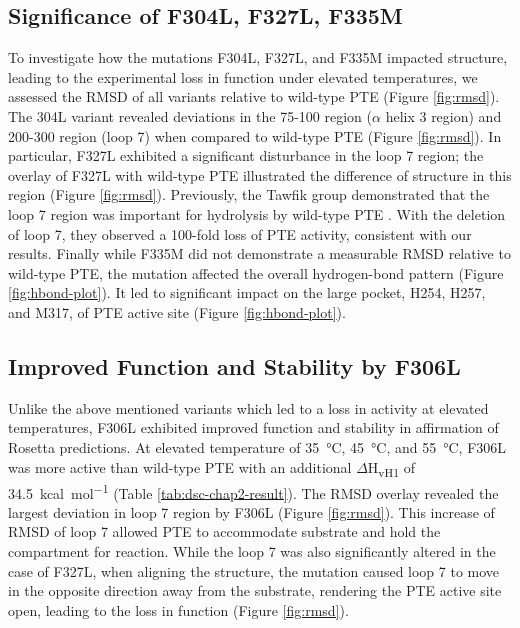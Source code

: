 \begin{refsection}
\subsection{Significance of F304L, F327L, F335M}

To investigate how the mutations F304L, F327L, and F335M impacted structure,
leading to the experimental loss in function under elevated temperatures, we
assessed the RMSD of all variants relative to wild-type PTE (Figure
\ref{fig:rmsd}). The 304L variant revealed deviations in the 75-100
region ($\alpha$ helix 3 region) and 200-300 region (loop 7) when compared to
wild-type PTE (Figure \ref{fig:rmsd}). In particular, F327L exhibited a
significant disturbance in the loop 7 region; the overlay of F327L with
wild-type PTE illustrated the difference of structure in this region (Figure
\ref{fig:rmsd}).  Previously, the Tawfik group demonstrated that the loop 7
region was important for hydrolysis by wild-type PTE \cite{Afriat-Jurnou2012}.
With the deletion of loop 7, they observed a 100-fold loss of PTE activity,
consistent with our results. Finally while F335M did not demonstrate a
measurable RMSD relative to wild-type PTE, the mutation affected the overall
hydrogen-bond pattern (Figure \ref{fig:hbond-plot}). It led to significant
impact on the large pocket, H254, H257, and M317, of PTE active site (Figure
\ref{fig:hbond-plot}). 

\subsection{Improved Function and Stability by F306L}

Unlike the above mentioned variants which led to a loss in activity at elevated
temperatures, F306L exhibited improved function and stability in affirmation of
Rosetta predictions. At elevated temperature of \SI{35}{\celsius},
\SI{45}{\celsius}, and \SI{55}{\celsius}, F306L was more active than wild-type
PTE with an additional $\Delta$H\textsubscript{vH1} of \SI{34.5}{kcal\per\mole}
(Table \ref{tab:dsc-chap2-result}). The RMSD overlay revealed the largest deviation
in loop 7 region by F306L  (Figure \ref{fig:rmsd}). This increase of RMSD of
loop 7 allowed PTE to accommodate substrate and hold the compartment for
reaction. While the loop 7 was also significantly altered in the case of F327L,
when aligning the structure, the mutation caused loop 7 to move in the opposite
direction away from the substrate, rendering the PTE active site open, leading
to the loss in function (Figure \ref{fig:rmsd}).


\end{refsection}
